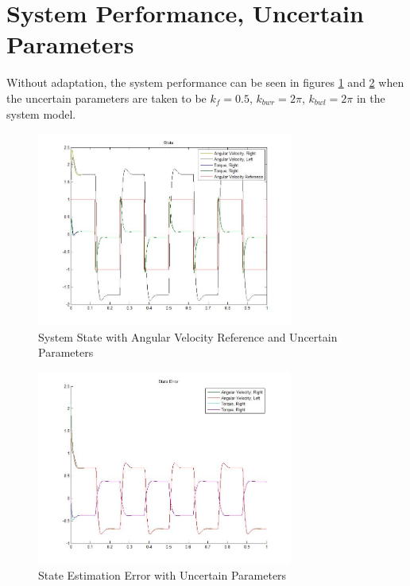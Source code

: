 \documentclass[letterpaper,12pt]{report}
\begin{document}
\section{System Performance, Uncertain \mbox{Parameters}}
Without adaptation, the system performance can be seen in figures \ref{fig:ssUpDiagram1} and \ref{fig:seUpDiagram1} when the uncertain parameters are taken to be $k_f = 0.5$, $k_{bwr} = 2\pi$, $k_{bwl} = 2\pi$ in the system model.
\begin{figure}[H!]
	\centering
	\includegraphics[width=0.75\textwidth]{Uncertain_State1.jpg}
	\caption{System State with Angular Velocity Reference and Uncertain Parameters}
	\label{fig:ssUpDiagram1}
\end{figure}
\begin{figure}[H!]
	\centering
	\includegraphics[width=0.75\textwidth]{Uncertain_StateError1.jpg}
	\caption{State Estimation Error with Uncertain Parameters}
	\label{fig:seUpDiagram1}
\end{figure}
\end{document}
